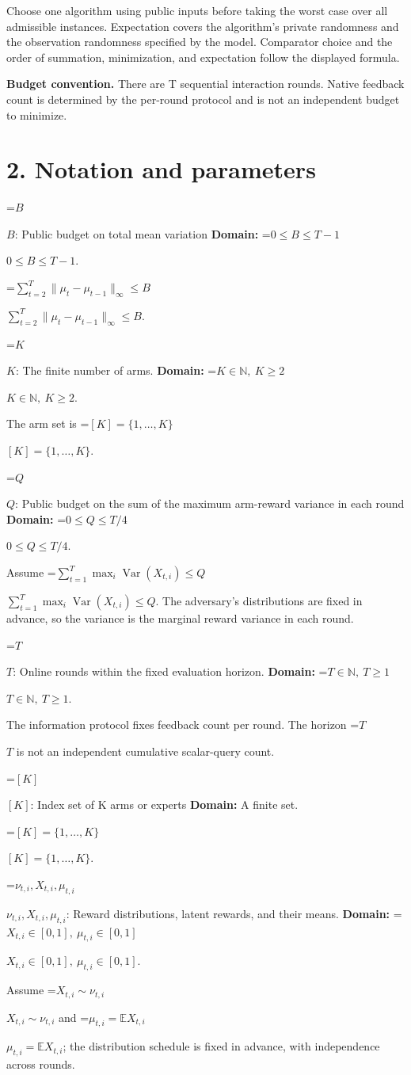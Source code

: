 \documentclass[10pt,a4paper]{article}
\newcommand{\AtlasMath}[1]{\par\begingroup\centering\setbox0=\hbox{$\displaystyle #1$}\ifdim\wd0>1.4\linewidth\typeout{ATLAS WIDE FORMULA: \the\wd0}\fi\ifdim\wd0>\linewidth\resizebox{\linewidth}{!}{\box0}\else\box0\fi\par\endgroup}
\newcommand{\AtlasInlineMath}[1]{\begingroup\setbox0=\hbox{$#1$}\ifdim\wd0>.4\linewidth\endgroup\AtlasMath{#1}\else\endgroup$#1$\fi}
\begin{document}
Choose one algorithm using public inputs before taking the worst case over all admissible instances. Expectation covers the algorithm's private randomness and the observation randomness specified by the model. Comparator choice and the order of summation, minimization, and expectation follow the displayed formula.

\textbf{Budget convention.} There are T sequential interaction rounds. Native feedback count is determined by the per-round protocol and is not an independent budget to minimize.

\section{2. Notation and parameters}
\AtlasInlineMath{B}: Public budget on total mean variation \textbf{Domain:} \AtlasInlineMath{0\le B\le T-1}.

\AtlasInlineMath{\sum_{t=2}^T\|\mu_t-\mu_{t-1}\|_\infty\le B}.

\AtlasInlineMath{K}: The finite number of arms. \textbf{Domain:} \AtlasInlineMath{K\in\mathbb N,\ K\ge2}.

The arm set is \AtlasInlineMath{[K]=\{1,\ldots,K\}}.

\AtlasInlineMath{Q}: Public budget on the sum of the maximum arm-reward variance in each round \textbf{Domain:} \AtlasInlineMath{0\le Q\le T/4}.

Assume \AtlasInlineMath{\sum_{t=1}^T\max_i\operatorname{Var}(X_{t,i})\le Q}. The adversary's distributions are fixed in advance, so the variance is the marginal reward variance in each round.

\AtlasInlineMath{T}: Online rounds within the fixed evaluation horizon. \textbf{Domain:} \AtlasInlineMath{T\in\mathbb N,\ T\ge1}.

The information protocol fixes feedback count per round. The horizon \AtlasInlineMath{T} is not an independent cumulative scalar-query count.

\AtlasInlineMath{[K]}: Index set of K arms or experts \textbf{Domain:} A finite set.

\AtlasInlineMath{[K]=\{1,\ldots,K\}}.

\AtlasInlineMath{\nu_{t,i},X_{t,i},\mu_{t,i}}: Reward distributions, latent rewards, and their means. \textbf{Domain:} \AtlasInlineMath{X_{t,i}\in[0,1],\ \mu_{t,i}\in[0,1]}.

Assume \AtlasInlineMath{X_{t,i}\sim\nu_{t,i}} and \AtlasInlineMath{\mu_{t,i}=\mathbb E X_{t,i}}; the distribution schedule is fixed in advance, with independence across rounds.
\end{document}
